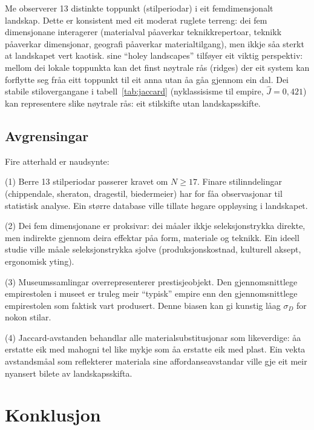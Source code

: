 \documentclass[10pt, a4paper, twocolumn]{article}
\begin{document}
Me observerer 13 distinkte toppunkt (stilperiodar) i eit fem\-dimen\-sjonalt landskap. Dette er konsistent med eit moderat ruglete terreng: dei fem dimensjonane interagerer (materialval p\r{a}averkar teknikkrepertoar, teknikk p\r{a}averkar dimensjonar, geografi p\r{a}averkar materialtilgang), men ikkje s\r{a}a sterkt at landskapet vert kaotisk. \citet{gavrilets2004} sine ``holey landscapes'' tilf\o yer eit viktig perspektiv: mellom dei lokale toppunkta kan det finst n\o ytrale r\aa s (ridges) der eit system kan forflytte seg fr\r{a}a eitt toppunkt til eit anna utan \r{a}a g\r{a}a gjennom ein dal. Dei stabile stilovergangane i tabell~\ref{tab:jaccard} (nyklassisisme til empire, $\hat{J} = 0{,}421$) kan representere slike n\o ytrale r\aa s: eit stilskifte utan landskapsskifte.


\subsection{Avgrensingar}

Fire atterhald er naudsynte:

(1) Berre 13 stilperiodar passerer kravet om $N \geq 17$. Finare stilinndelingar (chippendale, sheraton, dragestil, biedermeier) har for f\r{a}a observasjonar til statistisk analyse. Ein st\o rre database ville tillate h\o gare oppl\o ysing i landskapet.

(2) Dei fem dimensjonane er proksivar: dei m\r{a}aler ikkje seleksjonstrykka direkte, men indirekte gjennom deira effektar p\r{a}a form, materiale og teknikk. Ein ideell studie ville m\r{a}ale seleksjonstrykka sjolve (produksjonskostnad, kulturell aksept, ergonomisk yting).

(3) Museumssamlingar overrepresenterer prestisjeobjekt. Den gjennomsnittlege empirestolen i museet er truleg meir ``typisk'' empire enn den gjennomsnittlege empirestolen som faktisk vart produsert. Denne biasen kan gi kunstig l\r{a}ag $\sigma_D$ for nokon stilar.

(4) Jaccard-avstanden behandlar alle materialsubstitusjonar som likeverdige: \r{a}a erstatte eik med mahogni tel like mykje som \r{a}a erstatte eik med plast. Ein vekta avstandsm\r{a}al som reflekterer materiala sine affordanseavstandar ville gje eit meir nyansert bilete av landskapsskifta.


\section{Konklusjon}
\end{document}
